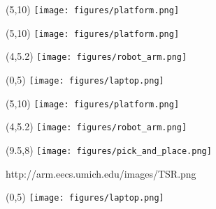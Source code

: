 \documentclass{beamer}
\begin{document}
 \begin{frame}[plain]{}
     \begin{textblock}{5}(5,10)
         \texttt{[image: figures/platform.png]}
     \end{textblock}
    \end{frame}
    
     \begin{frame}[plain]{}
         \begin{textblock}{5}(5,10)
             \texttt{[image: figures/platform.png]}
            \end{textblock}
         \begin{textblock}{5}(4,5.2)
             \texttt{[image: figures/robot\_arm.png]}
            \end{textblock}
          \begin{textblock}{5}(0,5)
              \texttt{[image: figures/laptop.png]}
            \end{textblock} 
        \end{frame}
        
         \begin{frame}[plain]{}
             \begin{textblock}{5}(5,10)
                 \texttt{[image: figures/platform.png]}
                \end{textblock}
                \begin{textblock}{5}(4,5.2)
                    \texttt{[image: figures/robot\_arm.png]}
                \end{textblock}
                \begin{textblock}{5}(9.5,8)
                    \texttt{[image: figures/pick\_and\_place.png]}
                    
                    \tiny{http://arm.eecs.umich.edu/images/TSR.png}
                \end{textblock}                
          \begin{textblock}{5}(0,5)
              \texttt{[image: figures/laptop.png]}
          
            \end{textblock} 
            \end{frame}
        
\end{document}
